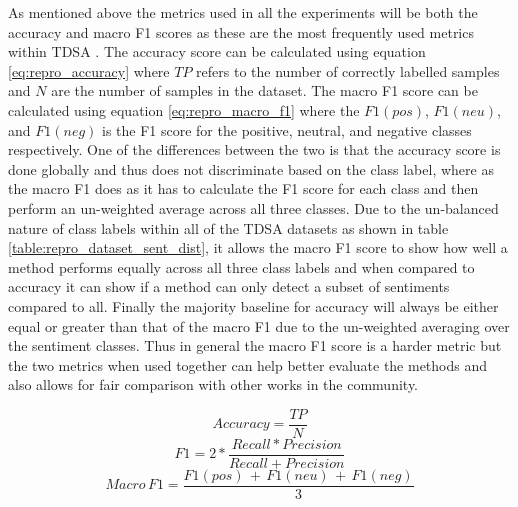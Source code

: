 As mentioned above the metrics used in all the experiments will be both the accuracy and macro F1 scores as these are the most frequently used metrics within TDSA \citep{dong-etal-2014-adaptive,wang-etal-2017-tdparse,he-etal-2018-exploiting}. The accuracy score can be calculated using equation \ref{eq:repro_accuracy} where $TP$ refers to the number of correctly labelled samples and $N$ are the number of samples in the dataset. The macro F1 score can be calculated using equation \ref{eq:repro_macro_f1} where the $F1(pos)$, $F1(neu)$, and $F1(neg)$ is the F1 score for the positive, neutral, and negative classes respectively. One of the differences between the two is that the accuracy score is done globally and thus does not discriminate based on the class label, where as the macro F1 does as it has to calculate the F1 score for each class and then perform an un-weighted average across all three classes. Due to the un-balanced nature of class labels within all of the TDSA datasets as shown in table \ref{table:repro_dataset_sent_dist}, it allows the macro F1 score to show how well a method performs equally across all three class labels and when compared to accuracy it can show if a method can only detect a subset of sentiments compared to all. Finally the majority baseline for accuracy will always be either equal or greater than that of the macro F1 due to the un-weighted averaging over the sentiment classes. Thus in general the macro F1 score is a harder metric but the two metrics when used together can help better evaluate the methods and also allows for fair comparison with other works in the community.

\begin{equation}
    Accuracy = \frac{TP}{N}
    \label{eq:repro_accuracy}
\end{equation}
\begin{equation}
    F1 = 2 * \frac{Recall * Precision}{Recall + Precision}
\end{equation}
\begin{equation}
    Macro\, F1 = \frac{F1(pos)\, +\, F1(neu)\, + \, F1(neg)}{3}
    \label{eq:repro_macro_f1}
\end{equation}

